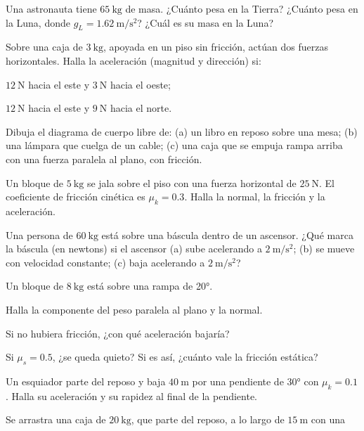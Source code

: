 \documentclass[11pt,a4paper]{article}
\begin{document}
\taller
\begin{ejercicios}
\item Una astronauta tiene $\SI{65}{\kilo\gram}$ de masa. ¿Cuánto pesa en la Tierra? ¿Cuánto pesa en la Luna, donde
  $g_L=\SI{1.62}{\meter\per\second\squared}$? ¿Cuál es su masa en la Luna?
\item Sobre una caja de $\SI{3}{\kilo\gram}$, apoyada en un piso sin fricción, actúan dos fuerzas horizontales.
  Halla la aceleración (magnitud y dirección) si:
  \begin{ejercicios}
  \item $\SI{12}{\newton}$ hacia el este y $\SI{3}{\newton}$ hacia el oeste;
  \item $\SI{12}{\newton}$ hacia el este y $\SI{9}{\newton}$ hacia el norte.
  \end{ejercicios}
\item Dibuja el diagrama de cuerpo libre de: (a) un libro en reposo sobre una mesa; (b) una lámpara que cuelga de un
  cable; (c) una caja que se empuja rampa arriba con una fuerza paralela al plano, con fricción.
\item Un bloque de $\SI{5}{\kilo\gram}$ se jala sobre el piso con una fuerza horizontal de $\SI{25}{\newton}$. El
  coeficiente de fricción cinética es $\mu_k=0.3$. Halla la normal, la fricción y la aceleración.
\item Una persona de $\SI{60}{\kilo\gram}$ está sobre una báscula dentro de un ascensor. ¿Qué marca la báscula (en
  newtons) si el ascensor (a) sube acelerando a $\SI{2}{\meter\per\second\squared}$; (b) se mueve con velocidad
  constante; (c) baja acelerando a $\SI{2}{\meter\per\second\squared}$?
\item Un bloque de $\SI{8}{\kilo\gram}$ está sobre una rampa de \ang{20}.
  \begin{ejercicios}
  \item Halla la componente del peso paralela al plano y la normal.
  \item Si no hubiera fricción, ¿con qué aceleración bajaría?
  \item Si $\mu_s=0.5$, ¿se queda quieto? Si es así, ¿cuánto vale la fricción estática?
  \end{ejercicios}
\item Un esquiador parte del reposo y baja $\SI{40}{\meter}$ por una pendiente de \ang{30} con $\mu_k=0.1$. Halla su
  aceleración y su rapidez al final de la pendiente.
\item Se arrastra una caja de $\SI{20}{\kilo\gram}$, que parte del reposo, a lo largo de $\SI{15}{\meter}$ con una

\end{ejercicios}
\end{document}
